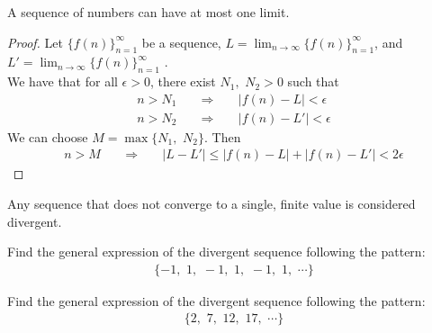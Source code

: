 \begin{theorem}
A sequence of numbers can have at most one limit.
\begin{proof}
    Let $\{f(n)\}_{n=1}^{\infty}$ be a sequence, $L = \lim_{n \longrightarrow \infty} \{f(n)\}_{n=1}^{\infty}$, and $L' = \lim_{n \longrightarrow \infty} \{f(n)\}_{n=1}^{\infty}$ .\\
    We have that for all $\epsilon > 0$, there exist $N_{1}, \hspace{4pt} N_{2} > 0$ such that
    \begin{align*}
        n > N_{1} \hspace{20pt} \Longrightarrow \hspace{20pt} \lvert f(n) - L \rvert < \epsilon \\[2ex]
        n > N_{2} \hspace{20pt} \Longrightarrow \hspace{20pt} \lvert f(n) - L' \rvert < \epsilon
    \end{align*}
    We can choose $M = \max\{N_1, \hspace{4pt} N_{2}\}$. Then
    \begin{align*}
        n > M \hspace{20pt} \Longrightarrow \hspace{20pt} \lvert L - L' \rvert \leq \lvert f(n) - L \rvert + \lvert f(n) - L' \rvert < 2\epsilon
    \end{align*}
\end{proof}
\label{limit_uniqueness}
\end{theorem}

\begin{note}
Any sequence that does not converge to a single, finite value is considered divergent.
\end{note}

\begin{exercise}
Find the general expression of the divergent sequence following the pattern:
\begin{align*}
    \{-1, \hspace{4pt} 1, \hspace{4pt} -1, \hspace{4pt} 1, \hspace{4pt} -1, \hspace{4pt} 1, \hspace{4pt} \cdots\}
\end{align*}
\end{exercise}

\begin{exercise}
Find the general expression of the divergent sequence following the pattern:
\begin{align*}
    \{2, \hspace{4pt} 7, \hspace{4pt} 12, \hspace{4pt} 17, \hspace{4pt} \cdots\}
\end{align*}
\end{exercise}

